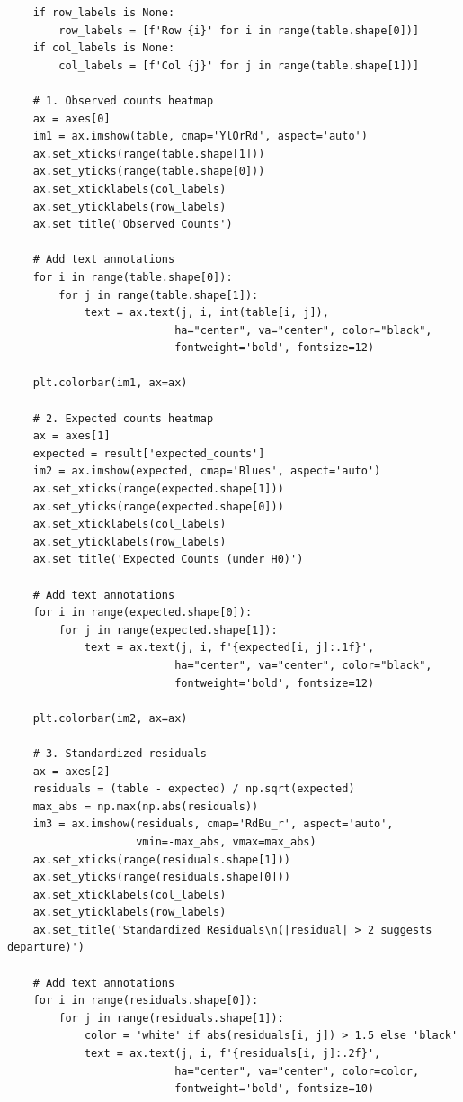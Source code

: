 \begin{lstlisting}
    if row_labels is None:
        row_labels = [f'Row {i}' for i in range(table.shape[0])]
    if col_labels is None:
        col_labels = [f'Col {j}' for j in range(table.shape[1])]

    # 1. Observed counts heatmap
    ax = axes[0]
    im1 = ax.imshow(table, cmap='YlOrRd', aspect='auto')
    ax.set_xticks(range(table.shape[1]))
    ax.set_yticks(range(table.shape[0]))
    ax.set_xticklabels(col_labels)
    ax.set_yticklabels(row_labels)
    ax.set_title('Observed Counts')

    # Add text annotations
    for i in range(table.shape[0]):
        for j in range(table.shape[1]):
            text = ax.text(j, i, int(table[i, j]),
                          ha="center", va="center", color="black",
                          fontweight='bold', fontsize=12)

    plt.colorbar(im1, ax=ax)

    # 2. Expected counts heatmap
    ax = axes[1]
    expected = result['expected_counts']
    im2 = ax.imshow(expected, cmap='Blues', aspect='auto')
    ax.set_xticks(range(expected.shape[1]))
    ax.set_yticks(range(expected.shape[0]))
    ax.set_xticklabels(col_labels)
    ax.set_yticklabels(row_labels)
    ax.set_title('Expected Counts (under H0)')

    # Add text annotations
    for i in range(expected.shape[0]):
        for j in range(expected.shape[1]):
            text = ax.text(j, i, f'{expected[i, j]:.1f}',
                          ha="center", va="center", color="black",
                          fontweight='bold', fontsize=12)

    plt.colorbar(im2, ax=ax)

    # 3. Standardized residuals
    ax = axes[2]
    residuals = (table - expected) / np.sqrt(expected)
    max_abs = np.max(np.abs(residuals))
    im3 = ax.imshow(residuals, cmap='RdBu_r', aspect='auto',
                    vmin=-max_abs, vmax=max_abs)
    ax.set_xticks(range(residuals.shape[1]))
    ax.set_yticks(range(residuals.shape[0]))
    ax.set_xticklabels(col_labels)
    ax.set_yticklabels(row_labels)
    ax.set_title('Standardized Residuals\n(|residual| > 2 suggests departure)')

    # Add text annotations
    for i in range(residuals.shape[0]):
        for j in range(residuals.shape[1]):
            color = 'white' if abs(residuals[i, j]) > 1.5 else 'black'
            text = ax.text(j, i, f'{residuals[i, j]:.2f}',
                          ha="center", va="center", color=color,
                          fontweight='bold', fontsize=10)


\end{lstlisting}

